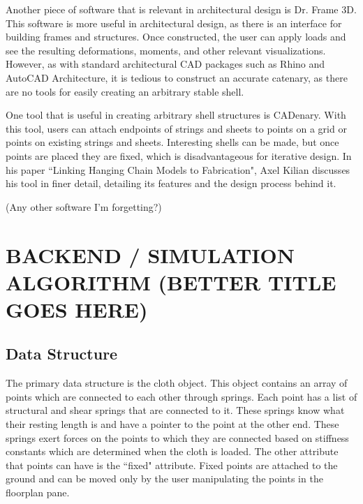 \documentclass{thesis}
\begin{document}
Another piece of software that is relevant in architectural design is Dr. Frame 3D\cite{drframe}.  This
software is more useful in architectural design, as there is an interface for building frames and structures.
Once constructed, the user can apply loads and see the resulting deformations, moments, and other relevant
visualizations.  However, as with standard architectural CAD packages such as Rhino\cite{rhino} and
AutoCAD Architecture\cite{autocad}, it is tedious to construct an accurate catenary, as there are no
tools for easily creating an arbitrary stable shell.

One tool that is useful in creating arbitrary shell structures is CADenary\cite{cadenary}.  With this tool,
users can attach endpoints of strings and sheets to points on a grid or points on existing strings and sheets.
Interesting shells can be made, but once points are placed they are fixed, which is disadvantageous for
iterative design.  In his paper ``Linking Hanging Chain Models to Fabrication"\cite{kilian05cadenary}, Axel Kilian
discusses his tool in finer detail, detailing its features and the design process behind it.

(Any other software I'm forgetting?)


\chapter{BACKEND / SIMULATION ALGORITHM (BETTER TITLE GOES HERE)}
\section{Data Structure}
The primary data structure is the cloth object.  This object contains an array of points which are connected to each other through springs.
Each point has a list of structural and shear springs that are connected to it.  These springs know what their resting length is and have
a pointer to the point at the other end.  These springs exert forces on the points to which they are connected based on stiffness constants
which are determined when the cloth is loaded.  The other attribute that points can have is the ``fixed" attribute.  Fixed points are
attached to the ground and can be moved only by the user manipulating the points in the floorplan pane.
\end{document}
